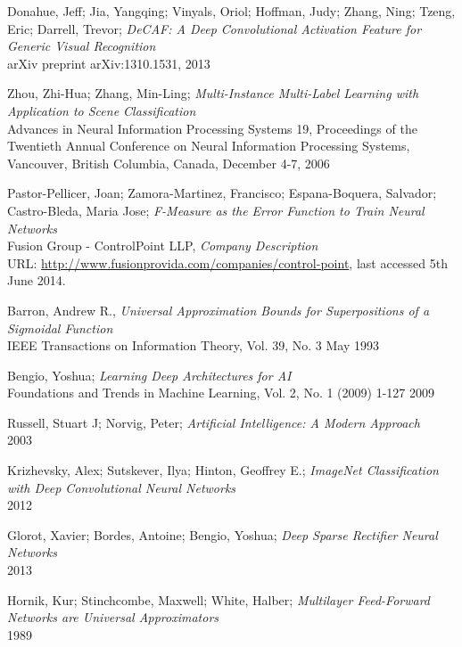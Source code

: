 \documentclass[a4paper,11pt]{article}
\begin{document}
\clearpage
\begin{thebibliography}{1}
 Donahue, Jeff; Jia, Yangqing; Vinyals, Oriol; Hoffman, Judy; Zhang, Ning; Tzeng, Eric; Darrell, Trevor;
  \emph{DeCAF: A Deep Convolutional Activation Feature for Generic Visual Recognition}\\
  arXiv preprint arXiv:1310.1531, 2013

 Zhou, Zhi-Hua; Zhang, Min-Ling;
  \emph{Multi-Instance Multi-Label Learning with Application to Scene Classification}\\
  Advances in Neural Information Processing Systems 19, 
  Proceedings of the Twentieth Annual Conference on Neural Information Processing Systems, 
  Vancouver, British Columbia, Canada, 
  December 4-7, 2006

 Pastor-Pellicer, Joan; Zamora-Martinez, Francisco; Espana-Boquera, Salvador; Castro-Bleda, Maria Jose;
  \emph{F-Measure as the Error Function to Train Neural Networks}\\

 Fusion Group - ControlPoint LLP,
 \emph{Company Description}\\
 URL: \url{http://www.fusionprovida.com/companies/control-point}, last accessed 5th June 2014. 
  
 Barron, Andrew R.,
 \emph{Universal Approximation Bounds for Superpositions of a Sigmoidal Function}\\
 IEEE Transactions on Information Theory, 
 Vol. 39, No. 3
 May 1993

 Bengio, Yoshua;
 \emph{Learning Deep Architectures for AI}\\
 Foundations and Trends in Machine Learning, 
 Vol. 2, No. 1 (2009) 1-127
 2009

 Russell, Stuart J; Norvig, Peter;
 \emph{Artificial Intelligence: A Modern Approach}\\
 2003

 Krizhevsky, Alex; Sutskever, Ilya; Hinton, Geoffrey E.;
 \emph{ImageNet Classification with Deep Convolutional Neural Networks}\\
 2012

 Glorot, Xavier; Bordes, Antoine; Bengio, Yoshua;
 \emph{Deep Sparse Rectifier Neural Networks}\\
 2013

 Hornik, Kur; Stinchcombe, Maxwell; White, Halber;
 \emph{Multilayer Feed-Forward Networks are Universal Approximators}\\
 1989
 
\end{thebibliography}
\end{document}
